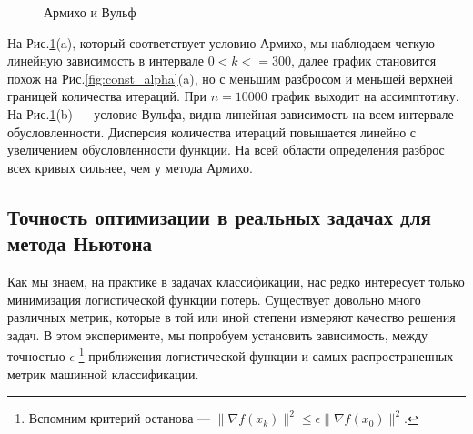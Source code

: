 \documentclass{article}
\begin{document}
	\newpage
	\begin{figure}[H]
		\centering
		\hfill %
		\caption{Армихо и Вульф}
		\label{fig:armijo_wolfe}
	\end{figure}
	
	На Рис.\ref{fig:armijo_wolfe}(a), который соответствует условию Армихо, мы наблюдаем четкую линейную зависимость в интервале $0 < k <= 300$, далее график становится похож на Рис.\ref{fig:const_alpha}(a), но с меньшим разбросом и меньшей верхней границей количества итераций. При $n = 10000$ график выходит на ассимптотику. На Рис.\ref{fig:armijo_wolfe}(b) --- условие Вульфа, видна линейная зависимость на всем интервале обусловленности. Дисперсия количества итераций повышается линейно с увеличением обусловленности функции. На всей области определения разброс всех кривых сильнее, чем у метода Армихо.
	
	\vspace{1cm}
	\subsection{Точность оптимизации в реальных задачах для метода Ньютона}
	
	Как мы знаем, на практике в задачах классификации, нас редко интересует только минимизация логистической функции потерь. Существует довольно много различных метрик, которые в той или иной степени измеряют качество решения задач. В этом эксперименте, мы попробуем установить зависимость, между точностью $\epsilon$ \footnote{Вспомним критерий останова --- $\|\nabla f(x_k) \|^2 \leq \epsilon \|\nabla f(x_0) \|^2$.} приближения логистической функции и самых распространенных метрик машинной классификации.
	
\end{document}
